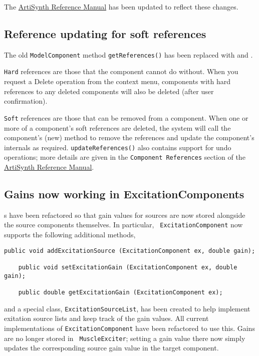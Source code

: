 \documentclass{article}
\begin{document}
The \href{http://www.artisynth.org/doc/html/artisynth/artisynth.html}%
{ArtiSynth Reference Manual} has been updated to reflect these
changes.

\subsection*{Reference updating for soft references}

The old {\tt ModelComponent} method {\tt getReferences()} has been
replaced with
and
.

{\tt Hard} references are those that the component cannot do without.
When you request a {\sf Delete} operation from the context menu,
components with hard references to any deleted components will also be
deleted (after user confirmation).

{\tt Soft} references are those that can be removed from a component.
When one or more of a component's soft references are deleted, the
system will call the component's (new)
method to remove the references and update the component's internals
as required. {\tt updateReferences()} also contains support for undo
operations; more details are given in the {\tt Component References}
section of the 
\href{http://www.artisynth.org/doc/html/artisynth/artisynth.html}%
{ArtiSynth Reference Manual}.

\subsection*{Gains now working in ExcitationComponents}

s have been
refactored so that gain values for sources are now stored alongside
the source components themselves.  In particular, {\tt
ExcitationComponent} now supports the following additional methods,
\begin{lstlisting}[]
    public void addExcitationSource (ExcitationComponent ex, double gain);

    public void setExcitationGain (ExcitationComponent ex, double gain);

    public double getExcitationGain (ExcitationComponent ex);
\end{lstlisting}
and a special class, {\tt ExcitationSourceList}, has been created to
help implement exitation source lists and keep track of the gain
values. All current implementations of {\tt ExcitationComponent} have
been refactored to use this. Gains are no longer stored in {\tt
MuscleExciter}; setting a gain value there now simply updates the
corresponding source gain value in the target component.
\end{document}
